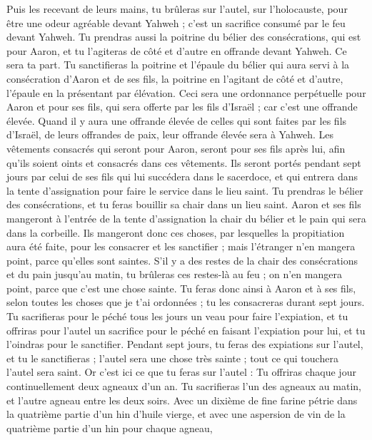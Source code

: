 \begin{multicols}{2}
Puis les recevant de leurs mains, tu brûleras sur l'autel, sur l'holocauste, pour être une odeur agréable devant Yahweh ; c'est un sacrifice consumé par le feu devant Yahweh.
Tu prendras aussi la poitrine du bélier des consécrations, qui est pour Aaron, et tu l’agiteras de côté et d’autre en offrande devant Yahweh. Ce sera ta part.
Tu sanctifieras la poitrine et l’épaule du bélier qui aura servi à la consécration d’Aaron et de ses fils, la poitrine en l’agitant de côté et d’autre, l’épaule en la présentant par élévation.
Ceci sera une ordonnance perpétuelle pour Aaron et pour ses fils, qui sera offerte par les fils d'Israël ; car c'est une offrande élevée. Quand il y aura une offrande élevée de celles qui sont faites par les fils d'Israël, de leurs offrandes de paix, leur offrande élevée sera à Yahweh.
Les vêtements consacrés qui seront pour Aaron, seront pour ses fils après lui, afin qu'ils soient oints et consacrés dans ces vêtements.
Ils seront portés pendant sept jours par celui de ses fils qui lui succédera dans le sacerdoce, et qui entrera dans la tente d’assignation pour faire le service dans le lieu saint.
Tu prendras le bélier des consécrations, et tu feras bouillir sa chair dans un lieu saint.
Aaron et ses fils mangeront à l'entrée de la tente d'assignation la chair du bélier et le pain qui sera dans la corbeille.
Ils mangeront donc ces choses, par lesquelles la propitiation aura été faite, pour les consacrer et les sanctifier ; mais l'étranger n'en mangera point, parce qu'elles sont saintes.
S'il y a des restes de la chair des consécrations et du pain jusqu’au matin, tu brûleras ces restes-là au feu ; on n'en mangera point, parce que c'est une chose sainte.
Tu feras donc ainsi à Aaron et à ses fils, selon toutes les choses que je t'ai ordonnées ; tu les consacreras durant sept jours.
Tu sacrifieras pour le péché tous les jours un veau pour faire l’expiation, et tu offriras pour l'autel un sacrifice pour le péché en faisant l’expiation pour lui, et tu l'oindras pour le sanctifier.
Pendant sept jours, tu feras des expiations sur l'autel, et tu le sanctifieras ; l'autel sera une chose très sainte ; tout ce qui touchera l'autel sera saint.
Or c'est ici ce que tu feras sur l'autel : Tu offriras chaque jour continuellement deux agneaux d'un an.
Tu sacrifieras l'un des agneaux au matin, et l'autre agneau entre les deux soirs.
Avec un dixième de fine farine pétrie dans la quatrième partie d'un hin d’huile vierge, et avec une aspersion de vin de la quatrième partie d'un hin pour chaque agneau,

\end{multicols}
